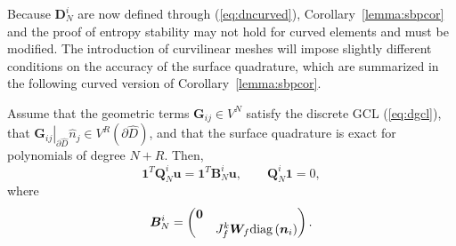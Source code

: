 \documentclass[review]{siamart0216}
\theoremstyle{assumption}
\renewcommand{\hat}[1]{\widehat{#1}}
\newcommand{\LRp}[1]{\left( #1 \right)}
\newcommand{\LRl}[1]{\left. #1 \right|}
\newcommand{\diag}[1]{{\rm diag}\LRp{#1}}
\begin{document}
Because $\bm{D}^i_N$ are now defined through (\ref{eq:dncurved}), Corollary~\ref{lemma:sbpcor} and the proof of entropy stability may not hold for curved elements and must be modified.  The introduction of curvilinear meshes will impose slightly different conditions on the accuracy of the surface quadrature, which are summarized in the following curved version of Corollary~\ref{lemma:sbpcor}.
\begin{lemma}
Assume that the geometric terms $\bm{G}_{ij} \in V^N$ satisfy the discrete GCL (\ref{eq:dgcl}), that $\LRl{\bm{G}_{ij}}_{\partial \hat{D}}\hat{n}_j \in V^R\LRp{\partial \hat{D}}$, and that the surface quadrature is exact for polynomials of degree $N+R$.  Then, 
\[
\bm{1}^T\bm{Q}^i_N\bm{u} = \bm{1}^T\bm{B}^i_N \bm{u}, %
\qquad \bm{Q}^i_N \bm{1} = 0, 
\]
where 
\[
\bm{B}^i_N =  \begin{pmatrix}
\bm{0}&\\
& {J^k_f}\bm{W}_f \diag{{\bm{n}_i}}
\end{pmatrix}.
\]
\label{lemma:vdsbpcurved}
\end{lemma}
\end{document}
